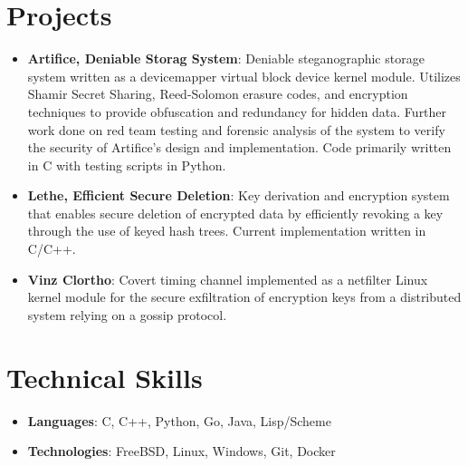 \documentclass[letterpaper,11pt]{article}
\newcommand{\resumeItem}[2]{
  \item\small{
    \textbf{#1}{: #2}
  }
}
\newcommand{\resumeSubItem}[2]{\resumeItem{#1}{#2}}
\newcommand{\resumeSubHeadingListStart}{\vspace{1pt}\begin{itemize}[noitemsep,nolistsep,leftmargin=*]}
\newcommand{\resumeSubHeadingListEnd}{\end{itemize}}
\begin{document}
\section{Projects}
  \resumeSubHeadingListStart
    \resumeSubItem{Artifice, Deniable Storag System}
      {Deniable steganographic storage system written as a devicemapper virtual block device kernel module. Utilizes Shamir Secret Sharing, Reed-Solomon erasure codes, and encryption techniques to provide obfuscation and redundancy for hidden data. Further work done on red team testing and forensic analysis of the system to verify the security of Artifice's design and implementation. Code primarily written in C with testing scripts in Python.}
    \resumeSubItem{Lethe, Efficient Secure Deletion}
      {Key derivation and encryption system that enables secure deletion of encrypted data by efficiently revoking a key through the use of keyed hash trees. Current implementation written in C/C++.}
    \resumeSubItem{Vinz Clortho}
      {Covert timing channel implemented as a netfilter Linux kernel module for the secure exfiltration of encryption keys from a distributed system relying on a gossip protocol.}
  \resumeSubHeadingListEnd

%
\section{Technical Skills}
  \resumeSubHeadingListStart
    \resumeSubItem{Languages}
      {C, C++, Python, Go, Java, Lisp/Scheme}
    \resumeSubItem{Technologies}
      {FreeBSD, Linux, Windows, Git, Docker}
  \resumeSubHeadingListEnd


\end{document}
